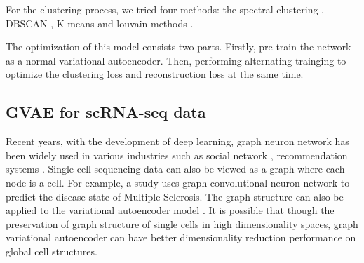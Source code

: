 For the clustering process, we tried four methods: the spectral clustering \cite{von2007tutorial}, DBSCAN \cite{ester1996density}, K-means \cite{kanungo2002efficient} and louvain methods \cite{traag2019louvain}. 

The optimization of this model consists two parts. Firstly, pre-train the network as a normal variational autoencoder. Then, performing alternating trainging to optimize the clustering loss and reconstruction loss at the same time.

\subsection{GVAE for scRNA-seq data}
Recent years, with the development of deep learning, graph neuron network has been widely used in various industries such as social network \cite{yang2016revisiting}, recommendation systems \cite{kipf2016semi}. Single-cell sequencing data can also be viewed as a graph where each node is a cell. For example, a study \cite{ravindra2020disease} uses graph convolutional neuron network \cite{velivckovic2017graph} to predict the disease state of Multiple Sclerosis. The graph structure can also be applied to the variational autoencoder model \cite{kipf2016variational}. It is possible that though the preservation of graph structure of single cells in high dimensionality spaces, graph variational autoencoder can have better dimensionality reduction performance on global cell structures.



